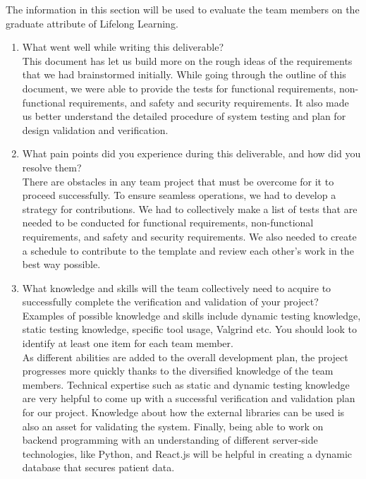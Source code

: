 \documentclass[12pt, titlepage]{article}
\begin{document}
The information in this section will be used to evaluate the team members on the
graduate attribute of Lifelong Learning.



\begin{enumerate}
  \item What went well while writing this deliverable?\\
  This document has let us build more on the rough ideas of the requirements that we had brainstormed initially. While going through the outline of this document, we were able to provide the tests for functional requirements, non-functional requirements, and safety and security requirements. It also made us better understand the detailed procedure of system testing and plan for design validation and verification. 
  
  \item What pain points did you experience during this deliverable, and how did you resolve them?\\
  There are obstacles in any team project that must be overcome for it to proceed successfully. To ensure seamless operations, we had to develop a strategy for contributions. We had to collectively make a list of tests that are needed to be conducted for functional requirements, non-functional requirements, and safety and security requirements. We also needed to create a schedule to contribute to the template and review each other's work in the best way possible.

  \item What knowledge and skills will the team collectively need to acquire to successfully complete the verification and validation of your project? Examples of possible knowledge and skills include dynamic testing knowledge, static testing knowledge, specific tool usage, Valgrind etc.  You should look to identify at least one item for each team member.\\
  As different abilities are added to the overall development plan, the project progresses more quickly thanks to the diversified knowledge of the team members. Technical expertise such as static and dynamic testing knowledge are very helpful to come up with a successful verification and validation plan for our project. Knowledge about how the external libraries can be used is also an asset for validating the system. Finally, being able to work on backend programming with an understanding of different server-side technologies, like Python, and React.js will be helpful in creating a dynamic database that secures patient data.


\end{enumerate}
\end{document}
